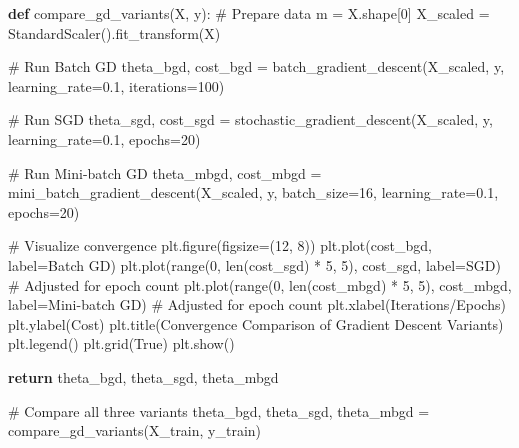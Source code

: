 \documentclass[
  letterpaper,
  DIV=11,
  numbers=noendperiod]{scrreprt}
\newenvironment{Shaded}{\begin{snugshade}}{\end{snugshade}}
\newcommand{\BuiltInTok}[1]{\textcolor[rgb]{0.00,0.23,0.31}{#1}}
\newcommand{\CommentTok}[1]{\textcolor[rgb]{0.37,0.37,0.37}{#1}}
\newcommand{\ControlFlowTok}[1]{\textcolor[rgb]{0.00,0.23,0.31}{\textbf{#1}}}
\newcommand{\DecValTok}[1]{\textcolor[rgb]{0.68,0.00,0.00}{#1}}
\newcommand{\FloatTok}[1]{\textcolor[rgb]{0.68,0.00,0.00}{#1}}
\newcommand{\KeywordTok}[1]{\textcolor[rgb]{0.00,0.23,0.31}{\textbf{#1}}}
\newcommand{\NormalTok}[1]{\textcolor[rgb]{0.00,0.23,0.31}{#1}}
\newcommand{\OperatorTok}[1]{\textcolor[rgb]{0.37,0.37,0.37}{#1}}
\newcommand{\StringTok}[1]{\textcolor[rgb]{0.13,0.47,0.30}{#1}}
\newcommand{\VariableTok}[1]{\textcolor[rgb]{0.07,0.07,0.07}{#1}}
\begin{document}
\begin{Shaded}
\begin{Highlighting}[]
\KeywordTok{def}\NormalTok{ compare\_gd\_variants(X, y):}
    \CommentTok{\# Prepare data}
\NormalTok{    m }\OperatorTok{=}\NormalTok{ X.shape[}\DecValTok{0}\NormalTok{]}
\NormalTok{    X\_scaled }\OperatorTok{=}\NormalTok{ StandardScaler().fit\_transform(X)}
    
    \CommentTok{\# Run Batch GD}
\NormalTok{    theta\_bgd, cost\_bgd }\OperatorTok{=}\NormalTok{ batch\_gradient\_descent(X\_scaled, y, learning\_rate}\OperatorTok{=}\FloatTok{0.1}\NormalTok{, iterations}\OperatorTok{=}\DecValTok{100}\NormalTok{)}
    
    \CommentTok{\# Run SGD}
\NormalTok{    theta\_sgd, cost\_sgd }\OperatorTok{=}\NormalTok{ stochastic\_gradient\_descent(X\_scaled, y, learning\_rate}\OperatorTok{=}\FloatTok{0.1}\NormalTok{, epochs}\OperatorTok{=}\DecValTok{20}\NormalTok{)}
    
    \CommentTok{\# Run Mini{-}batch GD}
\NormalTok{    theta\_mbgd, cost\_mbgd }\OperatorTok{=}\NormalTok{ mini\_batch\_gradient\_descent(X\_scaled, y, batch\_size}\OperatorTok{=}\DecValTok{16}\NormalTok{, learning\_rate}\OperatorTok{=}\FloatTok{0.1}\NormalTok{, epochs}\OperatorTok{=}\DecValTok{20}\NormalTok{)}
    
    \CommentTok{\# Visualize convergence}
\NormalTok{    plt.figure(figsize}\OperatorTok{=}\NormalTok{(}\DecValTok{12}\NormalTok{, }\DecValTok{8}\NormalTok{))}
\NormalTok{    plt.plot(cost\_bgd, label}\OperatorTok{=}\StringTok{\textquotesingle{}Batch GD\textquotesingle{}}\NormalTok{)}
\NormalTok{    plt.plot(}\BuiltInTok{range}\NormalTok{(}\DecValTok{0}\NormalTok{, }\BuiltInTok{len}\NormalTok{(cost\_sgd) }\OperatorTok{*} \DecValTok{5}\NormalTok{, }\DecValTok{5}\NormalTok{), cost\_sgd, label}\OperatorTok{=}\StringTok{\textquotesingle{}SGD\textquotesingle{}}\NormalTok{)  }\CommentTok{\# Adjusted for epoch count}
\NormalTok{    plt.plot(}\BuiltInTok{range}\NormalTok{(}\DecValTok{0}\NormalTok{, }\BuiltInTok{len}\NormalTok{(cost\_mbgd) }\OperatorTok{*} \DecValTok{5}\NormalTok{, }\DecValTok{5}\NormalTok{), cost\_mbgd, label}\OperatorTok{=}\StringTok{\textquotesingle{}Mini{-}batch GD\textquotesingle{}}\NormalTok{)  }\CommentTok{\# Adjusted for epoch count}
\NormalTok{    plt.xlabel(}\StringTok{\textquotesingle{}Iterations/Epochs\textquotesingle{}}\NormalTok{)}
\NormalTok{    plt.ylabel(}\StringTok{\textquotesingle{}Cost\textquotesingle{}}\NormalTok{)}
\NormalTok{    plt.title(}\StringTok{\textquotesingle{}Convergence Comparison of Gradient Descent Variants\textquotesingle{}}\NormalTok{)}
\NormalTok{    plt.legend()}
\NormalTok{    plt.grid(}\VariableTok{True}\NormalTok{)}
\NormalTok{    plt.show()}
    
    \ControlFlowTok{return}\NormalTok{ theta\_bgd, theta\_sgd, theta\_mbgd}

\CommentTok{\# Compare all three variants}
\NormalTok{theta\_bgd, theta\_sgd, theta\_mbgd }\OperatorTok{=}\NormalTok{ compare\_gd\_variants(X\_train, y\_train)}
\end{Highlighting}
\end{Shaded}
\end{document}

